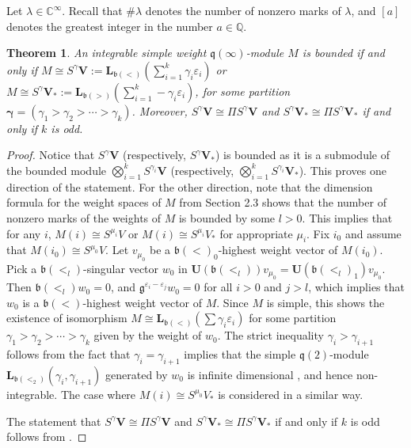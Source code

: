 \documentclass[12pt]{amsart}
\newcommand\C{\mathbb{C}}
\newcommand\Q{\mathbb{Q}}
\newcommand\g{\mathfrak{g}}
\newcommand\fq{\mathfrak{q}}
\newcommand\fh{\mathfrak{h}}
\newcommand\fb{\mathfrak{b}}
\newcommand\bV{\mathbf{V}}
\newcommand\bU{\mathbf{U}}
\newcommand\bL{\mathbf{L}}
\DeclareMathOperator{\Supp}{Supp} %
\theoremstyle{plain}
\newtheorem{theo}{Theorem}[section]
\theoremstyle{definition}
\numberwithin{equation}{section}
\begin{document}
Let $\lambda\in \C^\infty$. Recall that $\# \lambda$ denotes the number of nonzero marks of $\lambda$, and $[a]$ denotes the greatest integer in the number $a\in \Q$.

\begin{theo}\label{thm:classification.q}
An integrable simple weight $\fq(\infty)$-module $M$ is bounded if and only if $M\cong S^\gamma \bV := \bL_{\fb(<)} (\sum_{i=1}^k \gamma_i\varepsilon_i)$ or $M\cong S^\gamma \bV_* := \bL_{\fb(>)} (\sum_{i=1}^k -\gamma_i\varepsilon_i)$, for some partition $\pmb{\gamma} = (\gamma_1> \gamma_2> \cdots > \gamma_k)$. Moreover, $S^\gamma \bV\cong \Pi S^\gamma \bV$ and $S^\gamma \bV_*\cong \Pi S^\gamma \bV_*$ if and only if $k$ is odd.
\end{theo}
\begin{proof}
Notice that $S^\gamma \bV$ (respectively, $S^\gamma \bV_*$) is bounded as it is a submodule of the bounded module $\bigotimes_{i=1}^k S^{\gamma_i} \bV$ (respectively, $\bigotimes_{i=1}^k S^{\gamma_i} \bV_*$). This proves one direction of the statement. For the other direction, note that the dimension formula for the weight spaces of $M$ from Section 2.3 shows that the number of nonzero marks of the weights of $M$ is bounded by some $l>0$. This implies that for any $i$, $M(i)\cong S^{\mu_i} V$ or $M(i)\cong S^{\mu_i} V_*$ for appropriate $\mu_i$. Fix $i_0$ and assume that $ M(i_0) \cong S^{\mu_0} V$. Let $v_{\mu_0}$ be a $\fb(<)_0$-highest weight vector of $M(i_0)$. Pick a $\fb(<_l)$-singular vector $w_0$ in $\bU(\fb(<_l)) v_{\mu_0} = \bU(\fb(<_l)_1) v_{\mu_0}$. Then $\fb(<_l) w_0 =0$, and $\g^{\varepsilon_i - \varepsilon_{j}}w_0=0$ for all $i>0$ and $j > l$, which implies that $w_0$ is a $\fb(<)$-highest weight vector of $M$. Since $M$ is simple, this shows the existence of isomorphism $M\cong \bL_{\fb(<)} (\sum \gamma_i\varepsilon_i)$ for some partition $\gamma_1 > \gamma_2 > \cdots >\gamma_k$ given by the weight of $w_0$. The strict inequality $\gamma_i>\gamma_{i+1}$ follows from the fact that $\gamma_i = \gamma_{i+1}$ implies that the simple $\fq(2)$-module $\bL_{\fb(<_2)}(\gamma_i, \gamma_{i+1})$ generated by $w_0$ is infinite dimensional \cite{Pen86}, and hence non-integrable. The case where $M(i) \cong S^{\mu_{0}} V_* $ is considered in a similar way. 

The statement that $S^\gamma \bV\cong \Pi S^\gamma \bV$ and $S^\gamma \bV_*\cong \Pi S^\gamma \bV_*$ if and only if $k$ is odd follows from \cite[Proposition~4]{Pen86}.
\end{proof}
\end{document}
